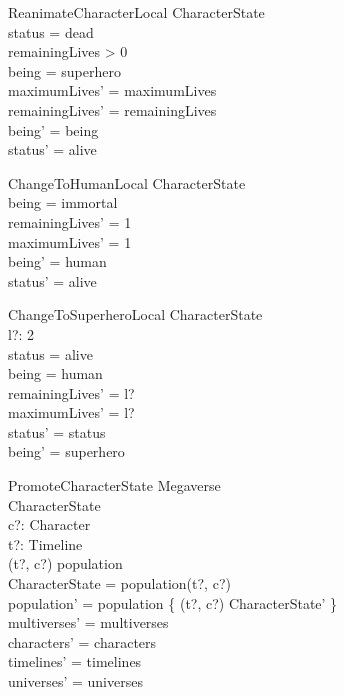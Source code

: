 \documentclass{article}
\begin{document}
\begin{schema}{ReanimateCharacterLocal}
\Delta CharacterState \\
\where
status = dead \\
remainingLives > 0 \\
being = superhero \\
maximumLives' = maximumLives \\
remainingLives' = remainingLives \\
being' = being \\
status' = alive \\
\end{schema}

\begin{schema}{ChangeToHumanLocal}
\Delta CharacterState \\
\where
being = immortal \\
remainingLives' = 1 \\
maximumLives' = 1 \\
being' = human \\
status' = alive \\
\end{schema}

\begin{schema}{ChangeToSuperheroLocal}
\Delta CharacterState \\
l?: 2  \\
\where
status = alive \\
being = human \\
remainingLives' = l? \\
maximumLives' = l? \\
status' = status \\
being' = superhero \\
\end{schema}

\begin{schema}{PromoteCharacterState}
\Delta Megaverse \\
\Delta CharacterState \\
c?: Character \\
t?: Timeline \\ 
\where 
(t?, c?) \in \dom population \\ 
\theta CharacterState = population(t?, c?) \\
population' = population \oplus \{ (t?, c?) \mapsto \theta CharacterState' \}   \\
multiverses' = multiverses \\
characters' = characters \\
timelines' = timelines \\
universes' = universes \\
\end{schema}
\end{document}
